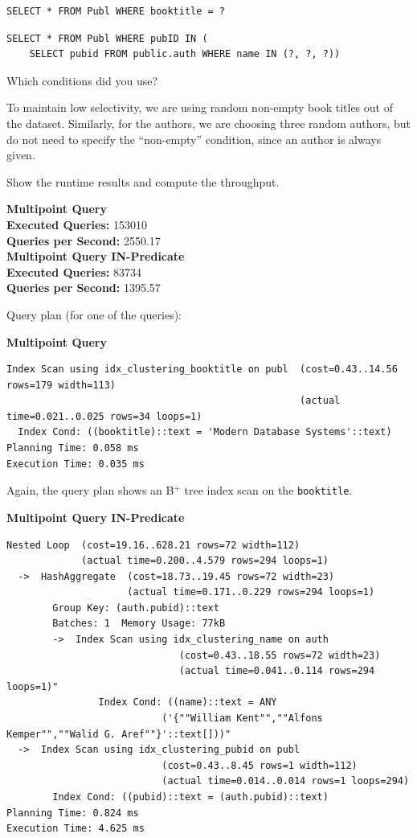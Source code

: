 \documentclass[11pt]{scrartcl}
\begin{document}
\begin{lstlisting}[style=dbtsql]
SELECT * FROM Publ WHERE booktitle = ?
\end{lstlisting}

\begin{lstlisting}[style=dbtsql]
SELECT * FROM Publ WHERE pubID IN (
    SELECT pubid FROM public.auth WHERE name IN (?, ?, ?))
\end{lstlisting}


Which conditions did you use?

To maintain low selectivity, we are using random non-empty book titles out of the dataset.
Similarly, for the authors, we are choosing three random authors, but do not need to specify the \enquote{non-empty}
condition, since an author is always given.

Show the runtime results and compute the throughput.

\textbf{Multipoint Query}\\
\textbf{Executed Queries: } 153010\\
\textbf{Queries per Second: } 2550.17 \\

\textbf{Multipoint Query IN-Predicate}\\
\textbf{Executed Queries: } 83734\\
\textbf{Queries per Second: } 1395.57

Query plan (for one of the queries):

\textbf{Multipoint Query}
{\small
\parskip0pt\begin{verbatim}
Index Scan using idx_clustering_booktitle on publ  (cost=0.43..14.56 rows=179 width=113)
                                                   (actual time=0.021..0.025 rows=34 loops=1)
  Index Cond: ((booktitle)::text = 'Modern Database Systems'::text)
Planning Time: 0.058 ms
Execution Time: 0.035 ms
\end{verbatim}}

Again, the query plan shows an B$^+$ tree index scan on the \texttt{booktitle}.

\textbf{Multipoint Query IN-Predicate}
{\small
\parskip0pt\begin{verbatim}
Nested Loop  (cost=19.16..628.21 rows=72 width=112)
             (actual time=0.200..4.579 rows=294 loops=1)
  ->  HashAggregate  (cost=18.73..19.45 rows=72 width=23)
                     (actual time=0.171..0.229 rows=294 loops=1)
        Group Key: (auth.pubid)::text
        Batches: 1  Memory Usage: 77kB
        ->  Index Scan using idx_clustering_name on auth
                              (cost=0.43..18.55 rows=72 width=23)
                              (actual time=0.041..0.114 rows=294 loops=1)"
                Index Cond: ((name)::text = ANY
                           ('{""William Kent"",""Alfons Kemper"",""Walid G. Aref""}'::text[]))"
  ->  Index Scan using idx_clustering_pubid on publ
                           (cost=0.43..8.45 rows=1 width=112)
                           (actual time=0.014..0.014 rows=1 loops=294)
        Index Cond: ((pubid)::text = (auth.pubid)::text)
Planning Time: 0.824 ms
Execution Time: 4.625 ms
\end{verbatim}}
\end{document}
